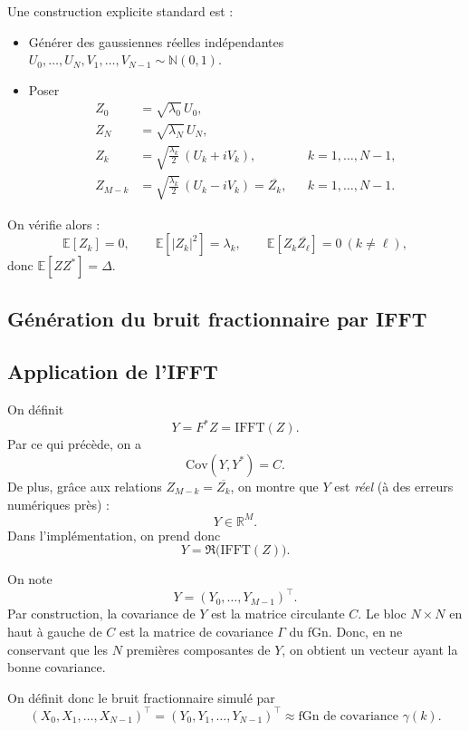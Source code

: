 \documentclass[11pt,a4paper]{article}
\newcommand{\R}{\mathbb{R}}
\newcommand{\N}{\mathbb{N}}
\newcommand{\E}{\mathbb{E}}
\newcommand{\Cov}{\mathrm{Cov}}
\newcommand{\1}{\mathbf{1}}
\begin{document}
Une construction explicite standard est :
\begin{itemize}
  \item Générer des gaussiennes réelles indépendantes
        $U_0,\dots,U_N,V_1,\dots,V_{N-1}\sim\N(0,1)$.
  \item Poser
    \begin{align}
      Z_0   &= \sqrt{\lambda_0}\,U_0,\\
      Z_N   &= \sqrt{\lambda_N}\,U_N,\\
      Z_k   &= \sqrt{\frac{\lambda_k}{2}}\,(U_k + iV_k),
              &&k=1,\dots,N-1,\\
      Z_{M-k} &= \sqrt{\frac{\lambda_k}{2}}\,(U_k - iV_k)
              = \overline{Z_k},
              &&k=1,\dots,N-1.
    \end{align}
\end{itemize}
On vérifie alors :
\[
  \E[Z_k] = 0,\qquad
  \E[|Z_k|^2] = \lambda_k,\qquad
  \E[Z_k\overline{Z_\ell}] = 0\ (k\ne\ell),
\]
donc $\E[Z Z^\ast] = \Delta$.

\subsection{Génération du bruit fractionnaire par IFFT}

\subsection{Application de l'IFFT}

On définit
\begin{equation}
  Y = F^\ast Z = \mathrm{IFFT}(Z).
\end{equation}
Par ce qui précède, on a
\begin{equation}
  \Cov(Y,Y^\ast) = C.
\end{equation}
De plus, grâce aux relations $Z_{M-k}=\overline{Z_k}$, on montre que
$Y$ est \emph{réel} (à des erreurs numériques près) :
\[
  Y \in \R^M.
\]
Dans l'implémentation, on prend donc
\[
  Y = \Re\bigl(\mathrm{IFFT}(Z)\bigr).
\]

On note
\[
  Y = (Y_0,\dots,Y_{M-1})^\top.
\]
Par construction, la covariance de $Y$ est la matrice circulante $C$.
Le bloc $N\times N$ en haut à gauche de $C$ est la matrice de covariance
$\Gamma$ du fGn.
Donc, en ne conservant que les $N$ premières composantes de $Y$,
on obtient un vecteur ayant la bonne covariance.

On définit donc le bruit fractionnaire simulé par
\begin{equation}
  (X_0,X_1,\dots,X_{N-1})^\top
  =
  (Y_0,Y_1,\dots,Y_{N-1})^\top
  \approx \text{fGn de covariance }\gamma(k).
\end{equation}
\end{document}
